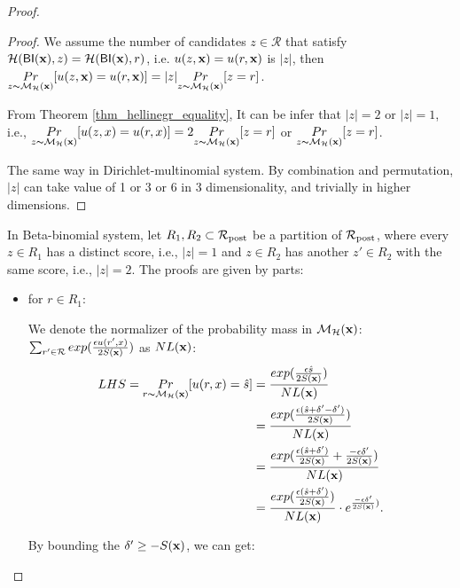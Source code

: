 \documentclass{article}
\begin{document}
\begin{proof}
\begin{proof}
 We assume the number of candidates $z \in \mathcal{R}$ that satisfy $\mathcal{H}(\mathsf{BI}(\textbf{x}),z) = \mathcal{H}(\mathsf{BI}(\textbf{x}),r)$, i.e. $u(z,\textbf{x}) = u(r,\textbf{x})$ is $|z|$, then  $\underset{z \thicksim \mathcal{M}_{\mathcal{H}}(\textbf{x})}{Pr}[u(z,\textbf{x}) = u(r,\textbf{x})] = |z| \underset{z \thicksim \mathcal{M}_{\mathcal{H}}(\textbf{x})}{Pr}[z = r]$.

 From Theorem \ref{thm_hellinegr_equality}, It can be infer that $|z| = 2$ or $|z| = 1$, i.e., $\underset{z \thicksim \mathcal{M}_{\mathcal{H}}(\textbf{x})}{Pr}[u(z,x) = u(r,x)] = 2 \underset{z \thicksim \mathcal{M}_{\mathcal{H}}(\textbf{x})}{Pr}[z = r]$ or $\underset{z \thicksim \mathcal{M}_{\mathcal{H}}(\textbf{x})}{Pr}[z = r]$.

 The same way in Dirichlet-multinomial system. By combination and permutation, $|z|$ can take value of 1 or 3 or 6 in 3 dimensionality, and trivially in higher dimensions.
 \end{proof}

 In Beta-binomial system, let $R_1, R_2 \subset \mathcal{R}_{\textup{post}}$ be a partition of $\mathcal{R}_{\textup{post}}$, where every $z \in R_1$ has a distinct score, i.e., $|z| = 1$ and $z \in R_2$ has another $z' \in R_2$ with the same score, i.e., $|z| = 2$. The proofs are given by parts: 

 \begin{itemize}
 	\item for $r \in R_1$:

		We denote the normalizer of the probability mass in $\mathcal{M}_{\mathcal{H}}(\textbf{x})$: $\sum_{r' \in \mathcal{R}}exp(\frac{\epsilon u(r',x)}{2 S(\textbf{x})})$ as $NL(\textbf{x})$:
		\begin{equation*}
		\begin{split}
		LHS 
		  = \underset{r \thicksim \mathcal{M}_{\mathcal{H}}(\textbf{x})}{Pr}[u(r,x) = \hat{s}]
		& = \frac{exp(\frac{\epsilon \hat{s}}{2 S(\textbf{x})})}{NL(\textbf{x})}\\
		& = \frac{exp(\frac{\epsilon (\hat{s} + \delta' - \delta')}{2 S(\textbf{x})})}{NL(\textbf{x})}\\
		& = \frac{exp(\frac{\epsilon (\hat{s} + \delta')}{2 S(\textbf{x})} + \frac{- \epsilon \delta'}{2 S(\textbf{x})})}{NL(\textbf{x})}\\
		& = \frac{exp(\frac{\epsilon (\hat{s} + \delta')}{2 S(\textbf{x})})}{NL(\textbf{x})} \cdot e^{\frac{- \epsilon \delta'}{2 S(\textbf{x})})}.\\
		\end{split}
		\end{equation*}

		By bounding the $\delta' \geq -S(\textbf{x})$, we can get:


\end{itemize}
\end{proof}
\end{document}
